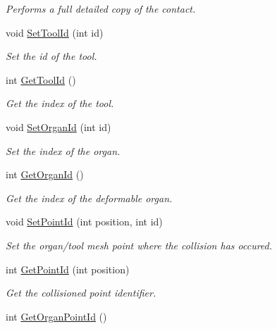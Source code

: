 \begin{DoxyCompactItemize}
\begin{DoxyCompactList}\small\item\em Performs a full detailed copy of the contact. \item\end{DoxyCompactList}\item 
void \hyperlink{classvtkContact_a449bcc29dbf1e58dcd342d949a9754cb}{SetToolId} (int id)
\begin{DoxyCompactList}\small\item\em Set the id of the tool. \item\end{DoxyCompactList}\item 
int \hyperlink{classvtkContact_a82d16317dbf303590a6d2834810b222c}{GetToolId} ()
\begin{DoxyCompactList}\small\item\em Get the index of the tool. \item\end{DoxyCompactList}\item 
void \hyperlink{classvtkContact_aeb38ed699e47ceb31df529db0ea8458f}{SetOrganId} (int id)
\begin{DoxyCompactList}\small\item\em Set the index of the organ. \item\end{DoxyCompactList}\item 
int \hyperlink{classvtkContact_a44064eb7f79795b0c685deb2ecca7ecc}{GetOrganId} ()
\begin{DoxyCompactList}\small\item\em Get the index of the deformable organ. \item\end{DoxyCompactList}\item 
void \hyperlink{classvtkContact_ac0b98ed46f961f3b2c2357905bf069f6}{SetPointId} (int position, int id)
\begin{DoxyCompactList}\small\item\em Set the organ/tool mesh point where the collision has occured. \item\end{DoxyCompactList}\item 
int \hyperlink{classvtkContact_a4b404cb999cbe287f2ea6c386e34d0fd}{GetPointId} (int position)
\begin{DoxyCompactList}\small\item\em Get the collisioned point identifier. \item\end{DoxyCompactList}\item 
\hypertarget{classvtkContact_ad823bd93ea5b6dfaa3490523710f8e98}{
int \hyperlink{classvtkContact_ad823bd93ea5b6dfaa3490523710f8e98}{GetOrganPointId} ()}
\label{classvtkContact_ad823bd93ea5b6dfaa3490523710f8e98}


\end{DoxyCompactItemize}

